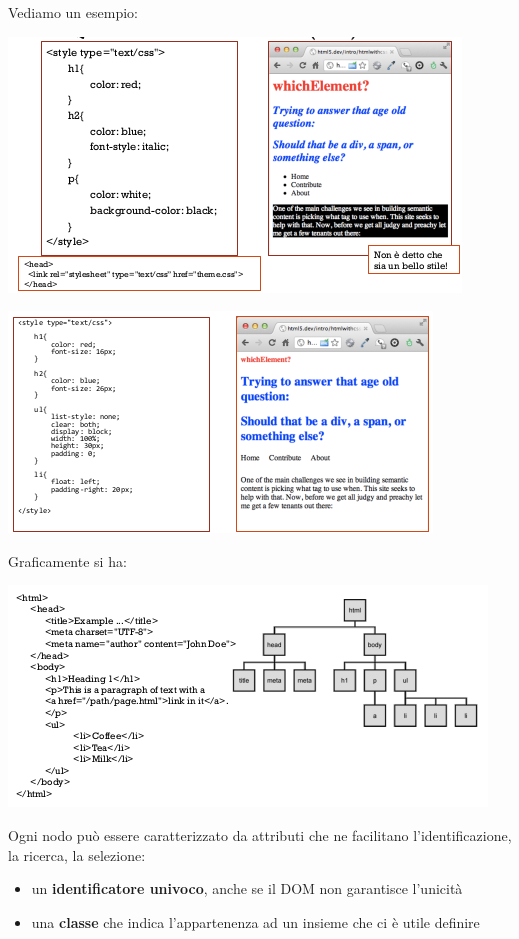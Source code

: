 \documentclass[a4paper,12pt, oneside]{book}
\begin{document}
Vediamo un esempio:
\begin{center}
	\includegraphics[scale=0.9]{img/css.png}
\end{center}
\begin{center}
	\includegraphics[scale=0.9]{img/css2.png}
\end{center}
Graficamente si ha:
\begin{center}
	\includegraphics[scale=0.9]{img/dom.png}
\end{center}
\newpage
Ogni nodo può essere caratterizzato da
attributi che ne facilitano l'identificazione, la ricerca, la selezione:
\begin{itemize}
	\item un \textbf{identificatore univoco}, anche se il DOM non garantisce l'unicità
	\item una \textbf{classe} che indica l'appartenenza ad
	      un insieme che ci è utile definire
\end{itemize}
\end{document}
